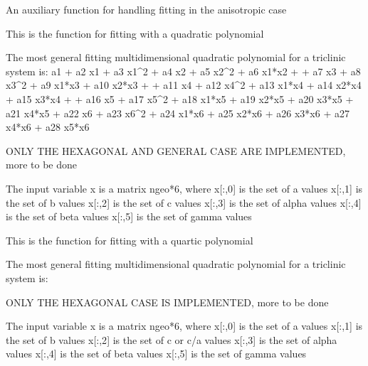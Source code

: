 \documentclass[letterpaper,10pt,english]{sphinxmanual}
\begin{document}

\begin{fulllineitems}
\label{pyqha:pyqha.fitutils.fit_anis}
An auxiliary function for handling fitting in the anisotropic case

\end{fulllineitems}


\begin{fulllineitems}
\label{pyqha:pyqha.fitutils.fit_quadratic}
This is the function for fitting with a quadratic polynomial

The most general fitting multidimensional quadratic polynomial for a triclinic
system is:
a1 + a2 x1 + a3 x1\textasciicircum{}2 + a4  x2 + a5  x2\textasciicircum{}2 + a6 x1*x2 +    
+ a7  x3 + a8  x3\textasciicircum{}2 + a9  x1*x3 + a10 x2*x3 +         
+ a11 x4 + a12 x4\textasciicircum{}2 + a13 x1*x4 + a14 x2*x4 + a15 x3*x4 +        
+ a16 x5 + a17 x5\textasciicircum{}2 + a18 x1*x5 + a19 x2*x5 + a20 x3*x5 + a21 x4*x5 
+ a22 x6 + a23 x6\textasciicircum{}2 + a24 x1*x6 + a25 x2*x6 + a26 x3*x6 + a27 x4*x6 + a28 x5*x6

ONLY THE HEXAGONAL AND GENERAL CASE ARE IMPLEMENTED, more to be done

The input variable x is a matrix ngeo*6, where
x{[}:,0{]} is the set of a values  
x{[}:,1{]} is the set of b values  
x{[}:,2{]} is the set of c values  
x{[}:,3{]} is the set of alpha values  
x{[}:,4{]} is the set of beta values   
x{[}:,5{]} is the set of gamma values

\end{fulllineitems}


\begin{fulllineitems}
\label{pyqha:pyqha.fitutils.fit_quartic}
This is the function for fitting with a quartic polynomial

The most general fitting multidimensional quadratic polynomial for a triclinic
system is:

ONLY THE HEXAGONAL CASE IS IMPLEMENTED, more to be done

The input variable x is a matrix ngeo*6, where
x{[}:,0{]} is the set of a values  
x{[}:,1{]} is the set of b values  
x{[}:,2{]} is the set of c or c/a values  
x{[}:,3{]} is the set of alpha values  
x{[}:,4{]} is the set of beta values   
x{[}:,5{]} is the set of gamma values

\end{fulllineitems}
\end{document}
